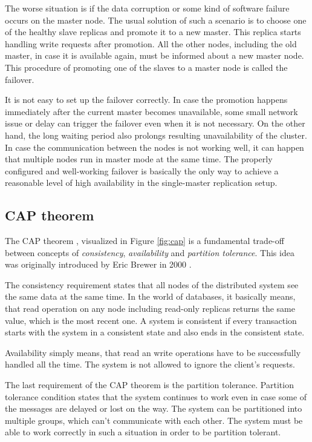 \documentclass[
  digital, %
  twoside, %
  table,   %
  nolof,   %
  nolot,   %
]{fithesis3}
\begin{document}
The worse situation is if the data corruption or some kind of software failure occurs on the master node. The usual solution of such a scenario is to choose one of the healthy slave replicas and promote it to a new master. This replica starts handling write requests after promotion. All the other nodes, including the old master, in case it is available again, must be informed about a new master node. This procedure of promoting one of the slaves to a master node is called the failover.

It is not easy to set up the failover correctly. In case the promotion happens immediately after the current master becomes unavailable, some small network issue or delay can trigger the failover even when it is not necessary. On the other hand, the long waiting period also prolongs resulting unavailability of the cluster. In case the communication between the nodes is not working well, it can happen that multiple nodes run in master mode at the same time. The properly configured and well-working failover is basically the only way to achieve a reasonable level of high availability in the single-master replication setup.

\subsection{CAP theorem}
The CAP theorem \cite{cap}, visualized in Figure \ref{fig:cap} is a fundamental trade-off between concepts of \textit{consistency}, \textit{availability} and \textit{partition tolerance}. This idea was originally introduced by Eric Brewer in 2000 \cite{brewer_cap}.

The consistency requirement states that all nodes of the distributed system see the same data at the same time. In the world of databases, it basically means, that read operation on any node including read-only replicas returns the same value, which is the most recent one. A system is consistent if every transaction starts with the system in a consistent state and also ends in the consistent state.

Availability simply means, that read an write operations have to be successfully handled all the time. The system is not allowed to ignore the client's requests.

The last requirement of the CAP theorem is the partition tolerance. Partition tolerance condition states that the system continues to work even in case some of the messages are delayed or lost on the way. The system can be partitioned into multiple groups, which can't communicate with each other. The system must be able to work correctly in such a situation in order to be partition tolerant.
\end{document}
